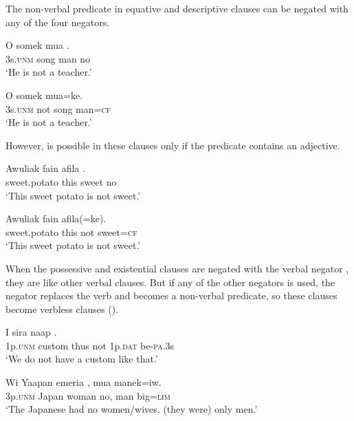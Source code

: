 The non-verbal predicate in equative and descriptive clauses can be negated with any of the four negators. 

\ea%
\label{ex:x1093}
\gll O  somek  mua  . \\
3s.\textsc{unm}  song  man  no\\
\glt `He is not a teacher.'
\z

\ea%
\label{ex:x1095}
\gll O    somek  mua=ke. \\
3s.\textsc{unm}  not  song  man=\textsc{cf}\\
\glt `He is not a teacher.' 
\z

However,  is possible in these clauses only if the predicate contains an adjective.

\ea%
\label{ex:x1096}
\gll Awuliak  fain  afila  . \\
sweet.potato  this  sweet  no\\
\glt `This sweet potato is not sweet.'
\z

\ea%
\label{ex:x1097}
\gll Awuliak  fain    afila(=ke). \\
sweet.potato  this  not  sweet=\textsc{cf}\\
\glt `This sweet potato is not sweet.'
\z

When the possessive and existential clauses are negated with the verbal negator , they are like other verbal clauses. But if any of the other negators is used, the negator replaces the verb and becomes a non-verbal predicate, so these clauses become verbless clauses ().

\ea%
\label{ex:x1098}
\gll I  sira  naap      . \\
1p.\textsc{unm}  custom  thus  not  1p.\textsc{dat}  be-\textsc{pa}.3s\\
\glt `We do not have a custom like that.'
\z

\ea%
\label{ex:x1094}
\gll Wi  Yaapan  emeria  ,  mua  manek=iw. \\
3p.\textsc{unm}  Japan  woman  no,  man  big=\textsc{lim}\\
\glt `The Japanese had no women/wives, (they were) only men.'
\z

